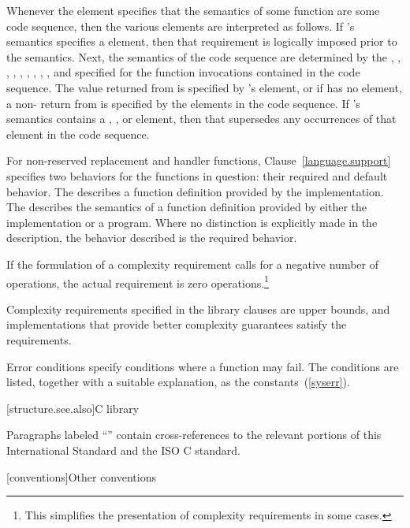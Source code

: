 \pnum
Whenever the \effects element specifies that the semantics of some function
 are  some code sequence, then the various elements are
interpreted as follows. If 's semantics specifies a \requires element, then
that requirement is logically imposed prior to the  semantics.
Next, the semantics of the code sequence are determined by the \requires, \effects,
\sync, \postconditions, \returns, \throws, \complexity, \remarks, \errors, and \realnotes
specified for the function invocations contained in the code sequence. The value
returned from  is specified by 's \returns element, or if 
has no \returns element, a non- return from  is specified by the
\returns elements in the code sequence. If 's semantics contains a \throws,
\postconditions, or \complexity element, then that supersedes any occurrences of that
element in the code sequence.

\pnum
For non-reserved replacement and handler functions,
Clause~\ref{language.support} specifies two behaviors for the functions in question:
their required and default behavior.
The
describes a function definition provided by the implementation.
%
The
describes the semantics of a function definition provided by
%
either the implementation or a \Cpp program.
Where no distinction is explicitly made in the description, the
behavior described is the required behavior.

\pnum
If the formulation of a complexity requirement calls for a negative number of
operations, the actual requirement is zero operations.\footnote{This simplifies
the presentation of complexity requirements in some cases.}

\pnum
Complexity requirements specified in the library clauses are upper bounds,
and implementations that provide better complexity guarantees satisfy
the requirements.

\pnum
Error conditions specify conditions where a function may fail. The conditions
are listed, together with a suitable explanation, as the 
constants~(\ref{syserr}).

[structure.see.also]{C library}

\pnum
Paragraphs labeled ``\xref'' contain cross-references to the relevant portions
of this International Standard and the ISO C standard.

[conventions]{Other conventions}
%

